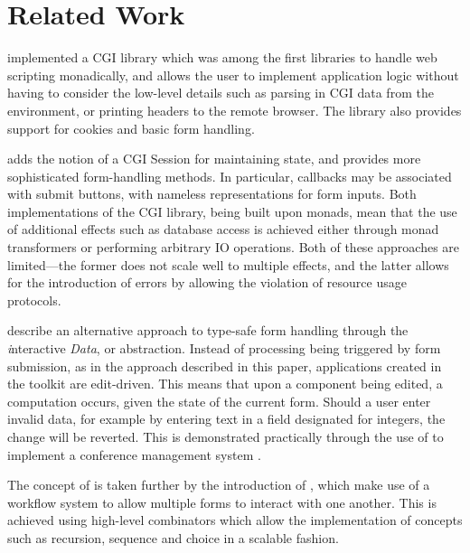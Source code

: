 \section{Related Work}
\citet{meijer:cgi} implemented a CGI library which was among the first
libraries to handle web scripting monadically, and allows the user to implement
application logic without having to consider the low-level details such as
parsing in CGI data from the environment, or printing headers to the remote
browser. The library also provides support for cookies and basic form handling. 

\citet{thiemann:wash} adds the notion of a CGI Session for maintaining
state, and provides more sophisticated form-handling methods. In particular,
callbacks may be associated with submit buttons, with nameless representations
for form inputs. Both implementations of the CGI library,
being built upon monads, mean that the use of additional effects such as
database access is achieved either through monad transformers or 
performing arbitrary IO operations. Both of these approaches are limited---the
former does not scale well to multiple effects, and the latter allows for the
introduction of errors by allowing the violation of resource usage protocols.

\citet{plasmeijer:idata} describe an alternative approach to type-safe form
handling through the
\textit{i}nteractive \textit{Data}, or \idata{} abstraction. Instead of
processing being triggered by form submission, as in the approach described in
this paper, applications created in the \idata{} toolkit are 
edit-driven. This means that upon a component being edited, a computation
occurs, given the state of the current form. Should a user enter invalid data, for example by entering
text in a field designated for integers, the change will be reverted. This is
demonstrated practically through the use of \idata{} to implement a conference
management system \cite{plasmeijer:cms}.

The concept of \idata{} is taken further by the introduction of \itasks{}
\cite{plasmeijer:itasks}, which make use of a workflow system to allow multiple
\idata{} forms to interact with one another. This is achieved using
high-level combinators which allow the implementation of concepts such as
recursion, sequence and choice in a scalable fashion.

